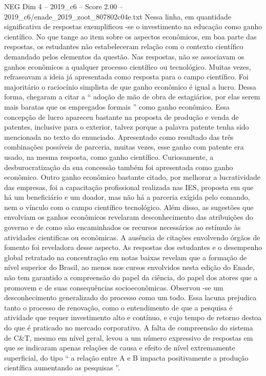 \begin{textsample}{NEG Dim 4 – 2019\_c6 – Score 2.00 – 2019\_c6/enade\_2019\_zoot\_807802c04e.txt}
Nessa linha, em quantidade significativa de respostas exemplificou -se o investimento na educação como ganho científico.
No que tange ao item sobre os aspectos econômicos, em boa parte das respostas, os estudantes não estabeleceram relação com o contexto científico demandado pelos elementos da questão.
Nas respostas, não se associavam os ganhos econômicos a qualquer processo científico ou tecnológico.
Muitas vezes, refraseavam a ideia já apresentada como resposta para o campo científico.
Foi majoritário o raciocínio simplista de que ganho econômico é igual a lucro.
Dessa forma, chegaram a citar a “ adoção de mão de obra de estagiários, por elas serem mais baratas que os empregados formais ” como ganho econômico.
Essa concepção de lucro apareceu bastante na proposta de produção e venda de patentes, inclusive para o exterior, talvez porque a palavra patente tenha sido mencionada no texto do enunciado.
Apresentado como resultado das três combinações possíveis de parceria, muitas vezes, esse ganho com patente era usado, na mesma resposta, como ganho científico.
Curiosamente, a desburocratização da sua concessão também foi apresentada como ganho econômico.
Outro ganho econômico bastante citado, por melhorar a lucratividade das empresas, foi a capacitação profissional realizada nas IES, proposta em que há um beneficiário e um doador, mas não há a parceria exigida pelo comando, nem o vínculo com o campo científico tecnológico.
Além disso, as sugestões que envolviam os ganhos econômicos revelaram desconhecimento das atribuições do governo e de como são encaminhados os recursos necessários ao estímulo às atividades cientificas ou econômicas.
A ausência de citações envolvendo órgãos de fomento foi reveladora desse aspecto.
As respostas dos estudantes e o desempenho global retratado na concentração em notas baixas revelam que a formação de nível superior do Brasil, ao menos nos cursos envolvidos nesta edição do Enade, não tem garantido a compreensão do papel da ciência, do papel dos atores que a promovem e de suas consequências socioeconômicas.
Observou -se um desconhecimento generalizado do processo como um todo.
Essa lacuna prejudica tanto o processo de renovação, como o entendimento de que a pesquisa é atividade que requer investimento alto e contínuo, e cujo tempo de retorno destoa do que é praticado no mercado corporativo.
A falta de compreensão do sistema de C\&T, mesmo em nível geral, levou a um número expressivo de respostas em que se indicaram apenas relações de causa e efeito de nível extremamente superficial, do tipo “ a relação entre A e B impacta positivamente a produção científica aumentando as pesquisas ”.

\end{textsample}

